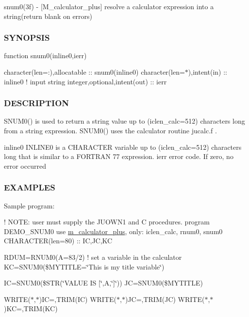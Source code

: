 snum0(3f) -\/ \mbox{[}M\+\_\+calculator\+\_\+plus\mbox{]} resolve a calculator expression into a string(return blank on errors) 

\subsubsection*{S\+Y\+N\+O\+P\+S\+IS}

function snum0(inline0,ierr)

character(len=\+:),allocatable \+:\+: snum0(inline0) character(len=$\ast$),intent(in) \+:\+: inline0 ! input string integer,optional,intent(out) \+:\+: ierr

\subsubsection*{D\+E\+S\+C\+R\+I\+P\+T\+I\+ON}

S\+N\+U\+M0() is used to return a string value up to (iclen\+\_\+calc=512) characters long from a string expression. S\+N\+U\+M0() uses the calculator routine jucalc.\+f .

inline0 I\+N\+L\+I\+N\+E0 is a C\+H\+A\+R\+A\+C\+T\+ER variable up to (iclen\+\_\+calc=512) characters long that is similar to a F\+O\+R\+T\+R\+AN 77 expression. ierr error code. If zero, no error occurred

\subsubsection*{E\+X\+A\+M\+P\+L\+ES}

Sample program\+:

! N\+O\+TE\+: user must supply the J\+U\+O\+W\+N1 and C procedures. program D\+E\+M\+O\+\_\+\+S\+N\+U\+M0 use \hyperlink{namespacem__calculator__plus}{m\+\_\+calculator\+\_\+plus}, only\+: iclen\+\_\+calc, rnum0, snum0 C\+H\+A\+R\+A\+C\+T\+ER(len=80) \+:\+: IC,JC,KC

R\+D\+UM=R\+N\+U\+M0(\textquotesingle{}A=83/2\textquotesingle{}) ! set a variable in the calculator KC=S\+N\+U\+M0(\textquotesingle{}\$\+M\+Y\+T\+I\+T\+LE=\char`\"{}\+This is my title variable\char`\"{}\textquotesingle{})

IC=S\+N\+U\+M0(\textquotesingle{}\$\+S\+TR(\char`\"{}\+V\+A\+L\+U\+E I\+S \mbox{[}\char`\"{},A,\char`\"{}\mbox{]}\char`\"{})\textquotesingle{}) JC=S\+N\+U\+M0(\textquotesingle{}\$\+M\+Y\+T\+I\+T\+LE\textquotesingle{})

W\+R\+I\+T\+E($\ast$,$\ast$)\textquotesingle{}IC=\textquotesingle{},T\+R\+I\+M(\+I\+C) W\+R\+I\+T\+E($\ast$,$\ast$)\textquotesingle{}JC=\textquotesingle{},T\+R\+I\+M(\+J\+C) W\+R\+I\+T\+E($\ast$,$\ast$)\textquotesingle{}KC=\textquotesingle{},T\+R\+I\+M(\+K\+C)

